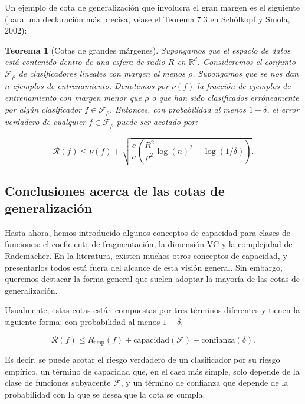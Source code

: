 \documentclass{report}
\newtheorem{thm}{Teorema}[subsection]
\begin{document}
Un ejemplo de cota de generalización que involucra el gran margen es el siguiente (para una 
declaración más precisa, véase el Teorema 7.3 en Schölkopf y Smola, 2002):\newline

\begin{thm}[Cotas de grandes márgenes]

Supongamos que el espacio de datos está contenido dentro de una esfera de radio \(R\) en 
\(\mathbb{R}^d\). Consideremos el conjunto \(\mathcal{F}_\rho\) de clasificadores lineales con 
margen al menos \(\rho\). Supongamos que se nos dan \(n\) ejemplos de entrenamiento. Denotemos 
por \(\nu(f)\) la fracción de ejemplos de entrenamiento con margen menor que \(\rho\) o que han 
sido clasificados erróneamente por algún clasificador \(f \in \mathcal{F}_\rho\). Entonces, con 
probabilidad al menos \(1 - \delta\), el error verdadero de cualquier \(f \in \mathcal{F}_\rho\) 
puede ser acotado por:

\[
\mathcal{R}(f) \leq \nu(f) + \sqrt{\frac{c}{n} \left( \frac{R^2}{\rho^2} \log(n)^2 + \log(1/\delta) \right)} .
\]
\end{thm}

\subsection{Conclusiones acerca de las cotas de generalización}

Hasta ahora, hemos introducido algunos conceptos de capacidad para clases de funciones: el 
coeficiente de fragmentación, la dimensión VC y la complejidad de Rademacher. En la literatura, 
existen muchos otros conceptos de capacidad, y presentarlos todos está fuera del alcance de esta 
visión general. Sin embargo, queremos destacar la forma general que suelen adoptar la mayoría 
de las cotas de generalización.\newline

Usualmente, estas cotas están compuestas por tres términos diferentes y tienen la siguiente forma: 
con probabilidad al menos \(1 - \delta\),

\[
\mathcal{R}(f) \leq R_{\text{emp}}(f) + \text{capacidad}(\mathcal{F}) + \text{confianza}(\delta).
\]

Es decir, se puede acotar el riesgo verdadero de un clasificador por su riesgo empírico, un término 
de capacidad que, en el caso más simple, solo depende de la clase de funciones subyacente 
\(\mathcal{F}\), y un término de confianza que depende de la probabilidad con la que se desea que 
la cota se cumpla.\newline
\end{document}
